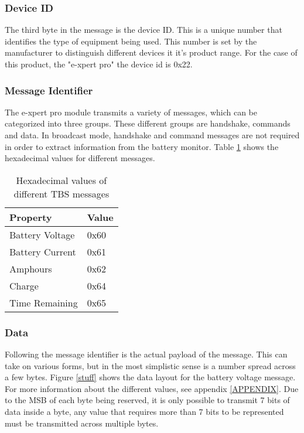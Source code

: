 \subsubsection{Device ID}

The third byte in the message is the device ID. This is a unique number that identifies the type of equipment being used. This number is set by the manufacturer to distinguish different devices it it's product range. For the case of this product, the "e-xpert pro" the device id is 0x22.

\subsubsection{Message Identifier}

The e-xpert pro module transmits a variety of messages, which can be categorized into three groups. These different groups are handshake, commands and data. In broadcast mode, handshake and command messages are not required in order to extract information from the battery monitor. Table \ref{tab:tbsmessages} shows the hexadecimal values for different messages.

\begin{table}
\begin{center}
    \begin{tabular}{|l|l|}
        \hline
        Property & Value \\ \hline
        Battery Voltage   & 0x60 \\
        Battery Current    & 0x61    \\ 
        Amphours    & 0x62    \\ 
        Charge       &  0x64 \\ 
        Time Remaining & 0x65 \\
        \hline
    \end{tabular}
	\caption{Hexadecimal values of different TBS messages}
	\label{tab:tbsmessages}
\end{center}
\end{table}

\subsubsection{Data}

Following the message identifier is the actual payload of the message. This can take on various forms, but in the most simplistic sense is a number spread across a few bytes. Figure \ref{stuff} shows the data layout for the battery voltage message. For more information about the different values, see appendix \ref{APPENDIX}.  Due to the MSB of each byte being reserved, it is only possible to transmit 7 bits of data inside a byte, any value that requires more than 7 bits to be represented must be transmitted across multiple bytes.  


